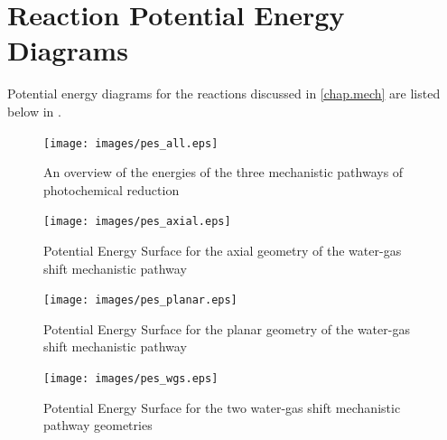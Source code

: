 \chapter{Reaction Potential Energy Diagrams} \label{app.energy}

Potential energy diagrams for the reactions discussed in \autoref{chap.mech} are listed below in . 

\begin{landscape}

\begin{figure}[!htbp]
 \begin{center}
  \texttt{[image: images/pes\_all.eps]}
 \end{center}
\caption{An overview of the energies of the three mechanistic pathways of photochemical  reduction}
\label{fig.pes_all}

\end{figure} 
\begin{figure}[!htbp]
 \begin{center}
  \texttt{[image: images/pes\_axial.eps]}
 \end{center}
\caption{Potential Energy Surface for the axial geometry of the water-gas shift mechanistic pathway}
\label{fig.pes_axial}

\end{figure} 
\begin{figure}[!htbp]
 \begin{center}
  \texttt{[image: images/pes\_planar.eps]}
 \end{center}
\caption{Potential Energy Surface for the planar geometry of the water-gas shift mechanistic pathway}
\label{fig.pes_planar}

\end{figure} 
\begin{figure}[!htbp]
 \begin{center}
  \texttt{[image: images/pes\_wgs.eps]}
 \end{center}
\caption{Potential Energy Surface for the two water-gas shift mechanistic pathway geometries}
\label{fig.pes_wgs}
\end{figure} 


\end{landscape}
